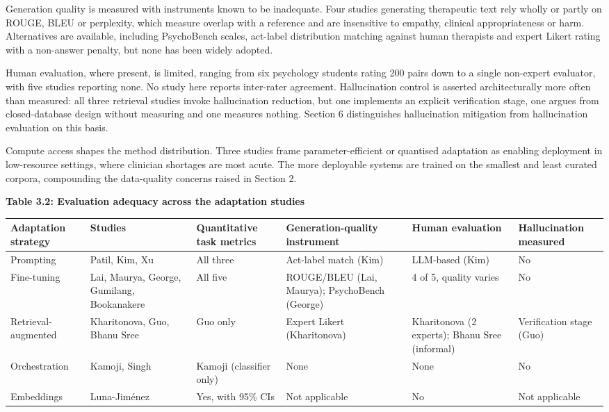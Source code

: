 \documentclass[11pt]{article}
\begin{document}
	Generation quality is measured with instruments known to be inadequate. Four studies generating therapeutic text rely wholly or partly on ROUGE, BLEU or perplexity, which measure overlap with a reference and are insensitive to empathy, clinical appropriateness or harm. Alternatives are available, including PsychoBench scales, act-label distribution matching against human therapists and expert Likert rating with a non-answer penalty, but none has been widely adopted.
	
	Human evaluation, where present, is limited, ranging from six psychology students rating 200 pairs down to a single non-expert evaluator, with five studies reporting none. No study here reports inter-rater agreement. Hallucination control is asserted architecturally more often than measured: all three retrieval studies invoke hallucination reduction, but one implements an explicit verification stage, one argues from closed-database design without measuring and one measures nothing. Section 6 distinguishes hallucination mitigation from hallucination evaluation on this basis.
	
	Compute access shapes the method distribution. Three studies frame parameter-efficient or quantised adaptation as enabling deployment in low-resource settings, where clinician shortages are most acute. The more deployable systems are trained on the smallest and least curated corpora, compounding the data-quality concerns raised in Section 2.
	
	\begin{center}
		\textbf{Table 3.2: Evaluation adequacy across the adaptation studies}
		\vspace{2pt}
		
		\scriptsize
		\setlength{\tabcolsep}{3pt}\renewcommand{\arraystretch}{1.1}
		\begin{tabularx}{\textwidth}{|X|X|X|X|X|X|}
			\hline
			\textbf{Adaptation strategy} & \textbf{Studies} & \textbf{Quantitative task metrics} & \textbf{Generation-quality instrument} & \textbf{Human evaluation} & \textbf{Hallucination measured} \\
			\hline
			Prompting & Patil, Kim, Xu & All three & Act-label match (Kim) & LLM-based (Kim) & No \\
			\hline
			Fine-tuning & Lai, Maurya, George, Gumilang, Bookanakere & All five & ROUGE/BLEU (Lai, Maurya); PsychoBench (George) & 4 of 5, quality varies & No \\
			\hline
			Retrieval-augmented & Kharitonova, Guo, Bhanu Sree & Guo only & Expert Likert (Kharitonova) & Kharitonova (2 experts); Bhanu Sree (informal) & Verification stage (Guo) \\
			\hline
			Orchestration & Kamoji, Singh & Kamoji (classifier only) & None & None & No \\
			\hline
			Embeddings & Luna-Jim\'enez & Yes, with 95\% CIs & Not applicable & No & Not applicable \\
			\hline
		\end{tabularx}
	\end{center}
	
\end{document}
